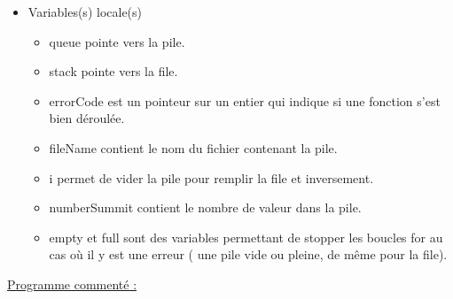 \documentclass[a4paper]{article}
\begin{document}
\begin{itemize}
\item Variables(s) locale(s)  

\begin{itemize}

\item queue pointe vers la pile.
\item stack pointe vers la file.
\item errorCode est un pointeur sur un entier qui indique si une fonction s'est bien déroulée.
\item fileName contient le nom du fichier contenant la pile.
\item i permet de vider la pile pour remplir la file et inversement.
\item numberSummit contient le nombre de valeur dans la pile.
\item empty et full sont des variables permettant de stopper les boucles for au cas où il y est une erreur ( une pile vide ou pleine, de même pour la file).
\end{itemize}
\end{itemize}
\underline{Programme commenté :}
\end{document}
